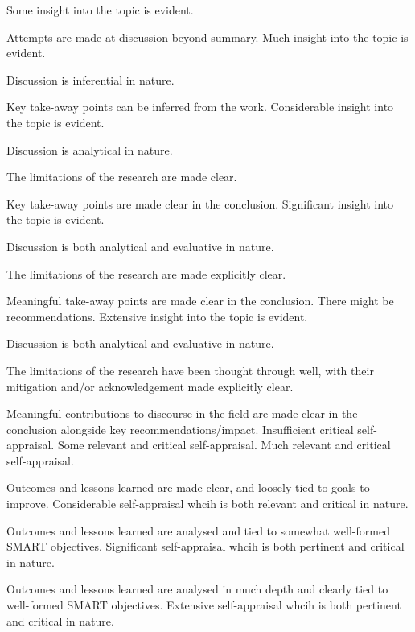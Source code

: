 \begin{markingrubric}
        \grade		Some insight into the topic is evident.
        \par		Attempts are made at discussion beyond summary.
        \grade		Much insight into the topic is evident.
        \par		Discussion is inferential in nature.
        \par		Key take-away points can be inferred from the work.
        \grade		Considerable insight into the topic is evident.
        \par		Discussion is analytical in nature.
        \par		The limitations of the research are made clear.
        \par		Key take-away points are made clear in the conclusion.
        \grade		Significant  insight into the topic is evident.
        \par		Discussion is both analytical and evaluative in nature.
        \par		The limitations of the research are made explicitly clear.
        \par		Meaningful take-away points are made clear in the conclusion. There might be recommendations.
        \grade		Extensive insight into the topic is evident.
        \par		Discussion is both analytical and evaluative in nature.
        \par		The limitations of the research have been thought through well, with their mitigation and/or acknowledgement made explicitly clear.
        \par		Meaningful contributions to discourse in the field are made clear in the conclusion alongside key recommendations/impact.       
%
        \grade\fail  	Insufficient critical self-appraisal.
        \grade		Some relevant and critical self-appraisal.
        \grade		Much relevant and critical self-appraisal.
        \par		Outcomes and lessons learned are made clear, and loosely tied to goals to improve.
        \grade		Considerable self-appraisal whcih is both relevant and critical in nature.
        \par		Outcomes and lessons learned are analysed and tied to somewhat well-formed SMART objectives.
        \grade		Significant self-appraisal whcih is both pertinent and critical in nature.
        \par		Outcomes and lessons learned are analysed in much depth and clearly tied to well-formed SMART objectives.
        \grade		Extensive self-appraisal whcih is both pertinent and critical in nature.

\end{markingrubric}
